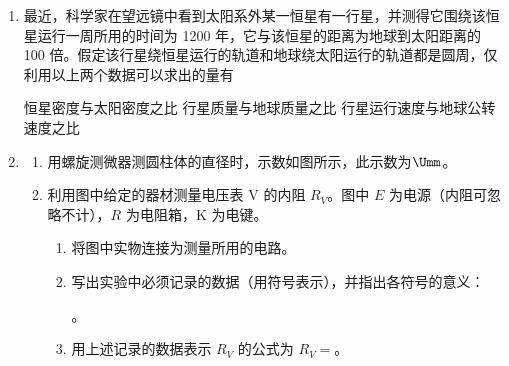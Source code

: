 \documentclass[\gkver]{gaokaozhenti}
\begin{document}
\begin{enumerate}
{c 正向上运动}
{该时刻以后，b 比 c 先到达平衡位置}
{该时刻以后，b 比 c 先到达离平衡位置最远处}


\item
最近，科学家在望远镜中看到太阳系外某一恒星有一行星，并测得它围绕该恒星运行一周所用的时间为 1200 年，它与该恒星的距离为地球到太阳距离的 100 倍。假定该行星绕恒星运行的轨道和地球绕太阳运行的轨道都是圆周，仅利用以上两个数据可以求出的量有

{恒星密度与太阳密度之比}
{行星质量与地球质量之比}
{行星运行速度与地球公转速度之比}


\item
\begin{enumerate}
	\item
	用螺旋测微器测圆柱体的直径时，示数如图所示，此示数为$\Umm$。


	\item
	利用图中给定的器材测量电压表 V 的内阻 $R_{V}$。图中 $E$ 为电源（内阻可忽略不计），$R$ 为电阻箱，K 为电键。

	\begin{enumerate}
		\item
		将图中实物连接为测量所用的电路。


		\item
		写出实验中必须记录的数据（用符号表示），并指出各符号的意义：

		。

		\item
		用上述记录的数据表示 $R_{V}$ 的公式为 $R_{V}=$。
	\end{enumerate}
\end{enumerate}


\end{enumerate}
\end{document}
